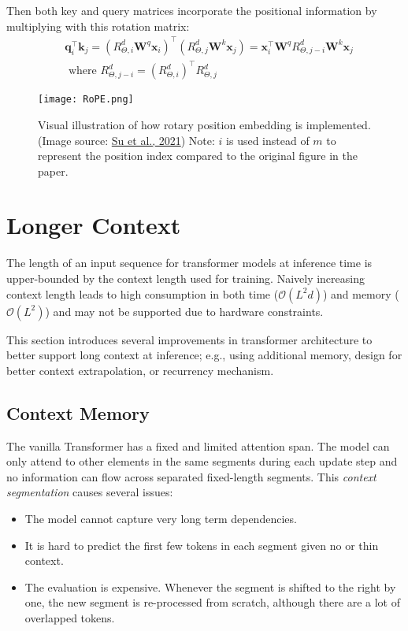 \documentclass[12pt]{article}
\begin{document}
Then both key and query matrices incorporate the positional information by multiplying with this rotation matrix:
\[
\begin{aligned}
& \mathbf{q}_i^\top \mathbf{k}_j = (R^d_{\Theta, i} \mathbf{W}^q\mathbf{x}_i)^\top (R^d_{\Theta, j} \mathbf{W}^k\mathbf{x}_j) = \mathbf{x}_i^\top\mathbf{W}^q R^d_{\Theta, j-i}\mathbf{W}^k\mathbf{x}_j \\
& \text{ where } R^d_{\Theta, j-i} = (R^d_{\Theta, i})^\top R^d_{\Theta, j}
\end{aligned}
\]
\begin{figure}[h!]
    \centering
    \texttt{[image: RoPE.png]}
    \caption{Visual illustration of how rotary position embedding is implemented. (Image source: \href{https://arxiv.org/abs/2104.09864}{Su et al., 2021}) Note: $i$ is used instead of $m$ to represent the position index compared to the original figure in the paper.}
\end{figure}

\section{Longer Context}
The length of an input sequence for transformer models at inference time is upper-bounded by the context length used for training. Naively increasing context length leads to high consumption in both time ($\mathcal{O}(L^2d)$) and memory ($\mathcal{O}(L^2)$) and may not be supported due to hardware constraints.

This section introduces several improvements in transformer architecture to better support long context at inference; e.g., using additional memory, design for better context extrapolation, or recurrency mechanism.

\subsection{Context Memory}
The vanilla Transformer has a fixed and limited attention span. The model can only attend to other elements in the same segments during each update step and no information can flow across separated fixed-length segments. This \emph{context segmentation} causes several issues:
\begin{itemize}
    \item The model cannot capture very long term dependencies.
    \item It is hard to predict the first few tokens in each segment given no or thin context.
    \item The evaluation is expensive. Whenever the segment is shifted to the right by one, the new segment is re-processed from scratch, although there are a lot of overlapped tokens.
\end{itemize}
\end{document}
